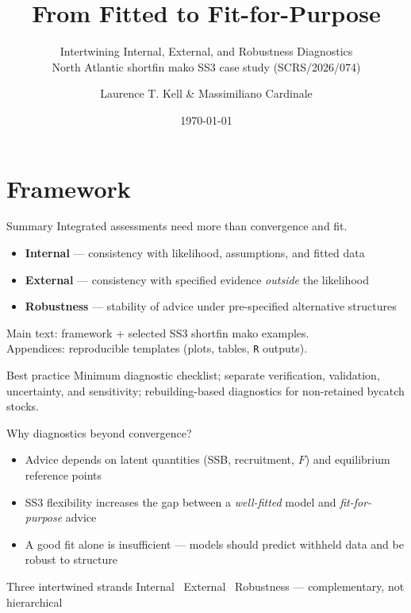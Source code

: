\documentclass[ignorenonframetext]{beamer}
\title{\textbf{From Fitted to Fit-for-Purpose}}
\subtitle{Intertwining Internal, External, and Robustness Diagnostics\\[0.4em]
\small North Atlantic shortfin mako SS3 case study (SCRS/2026/074)}
\author{Laurence T. Kell \& Massimiliano Cardinale}
\institute{Imperial College London \and SLU Aqua, Lysekil}
\date{\today}
\begin{document}
\begin{frame}[plain]
  \titlepage
\end{frame}

\section{Framework}

\begin{frame}{Summary}
  \small
  Integrated assessments need more than convergence and fit.
  \begin{itemize}
    \item \textbf{Internal} --- consistency with likelihood, assumptions, and fitted data
    \item \textbf{External} --- consistency with specified evidence \emph{outside} the likelihood
    \item \textbf{Robustness} --- stability of advice under pre-specified alternative structures
  \end{itemize}
  \vspace{0.4em}
  Main text: framework + selected SS3 shortfin mako examples.\\
  Appendices: reproducible templates (plots, tables, \texttt{R} outputs).
  \vspace{0.4em}
  \begin{alertblock}{Best practice}
    Minimum diagnostic checklist; separate verification, validation, uncertainty, and sensitivity; rebuilding-based diagnostics for non-retained bycatch stocks.
  \end{alertblock}
\end{frame}

\begin{frame}{Why diagnostics beyond convergence?}
  \begin{itemize}
    \item Advice depends on latent quantities (SSB, recruitment, $F$) and equilibrium reference points
    \item SS3 flexibility increases the gap between a \emph{well-fitted} model and \emph{fit-for-purpose} advice
    \item A good fit alone is insufficient --- models should predict withheld data and be robust to structure
  \end{itemize}
  \vspace{0.4em}
  \begin{alertblock}{Three intertwined strands}
    Internal \textbullet\ External \textbullet\ Robustness --- complementary, not hierarchical
  \end{alertblock}
\end{frame}
\end{document}
